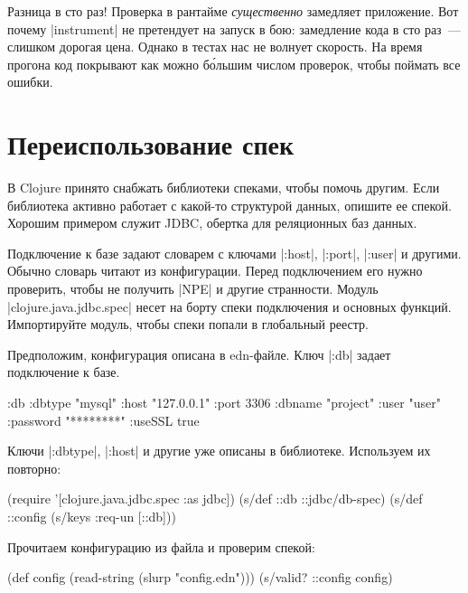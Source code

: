 Разница в сто раз! Проверка в рантайме \emph{существенно} замедляет приложение.
Вот почему \spverb|instrument| не претендует на запуск в бою: замедление кода в
сто раз~--- слишком дорогая цена. Однако в тестах нас не волнует скорость. На
время прогона код покрывают как можно б\'{о}льшим числом проверок, чтобы поймать
все ошибки.

\section{Переиспользование спек}

В Clojure принято снабжать библиотеки спеками, чтобы помочь другим. Если
библиотека активно работает с какой-то структурой данных, опишите ее
спекой. Хорошим примером служит JDBC,
обертка для реляционных баз данных.

Подключение к базе задают словарем с ключами \spverb|:host|, \spverb|:port|,
\spverb|:user| и другими. Обычно словарь читают из конфигурации. Перед
подключением его нужно проверить, чтобы не получить \spverb|NPE| и другие
странности. Модуль \spverb|clojure.java.jdbc.spec| несет на борту спеки
подключения и основных функций. Импортируйте модуль, чтобы спеки попали в
глобальный реестр.

Предположим, конфигурация описана в edn-файле. Ключ \spverb|:db| задает
подключение к базе.

\begin{english}
  \begin{clojure}
{:db {:dbtype "mysql"
      :host "127.0.0.1"
      :port 3306
      :dbname "project"
      :user "user"
      :password "********"
      :useSSL true}}
  \end{clojure}
\end{english}

Ключи \spverb|:dbtype|, \spverb|:host| и другие уже описаны в библиотеке.
Используем их повторно:

\begin{english}
  \begin{clojure}
(require '[clojure.java.jdbc.spec :as jdbc])
(s/def ::db ::jdbc/db-spec)
(s/def ::config (s/keys :req-un [::db]))
  \end{clojure}
\end{english}

Прочитаем конфигурацию из файла и проверим спекой:

\begin{english}
  \begin{clojure}
(def config (read-string (slurp "config.edn")))
(s/valid? ::config config)
  \end{clojure}
\end{english}

